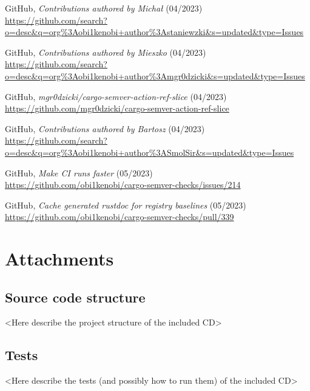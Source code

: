 \documentclass[licencjacka,en]{pracamgr}
\begin{document}
\begin{thebibliography}{99}
 GitHub,
	\textit{Contributions authored by Michał} (04/2023) \\
	\url{https://github.com/search?o=desc&q=org%3Aobi1kenobi+author%3Astaniewzki&s=updated&type=Issues}

 GitHub,
	\textit{Contributions authored by Mieszko} (04/2023) \\
	\url{https://github.com/search?o=desc&q=org%3Aobi1kenobi+author%3Amgr0dzicki&s=updated&type=Issues}

 GitHub,
	\textit{mgr0dzicki/cargo-semver-action-ref-slice} (04/2023) \\
	\url{https://github.com/mgr0dzicki/cargo-semver-action-ref-slice}

 GitHub,
	\textit{Contributions authored by Bartosz} (04/2023) \\
	\url{https://github.com/search?o=desc&q=org%3Aobi1kenobi+author%3ASmolSir&s=updated&type=Issues}




 GitHub,
	\textit{Make CI runs faster} (05/2023) \\
	\url{https://github.com/obi1kenobi/cargo-semver-checks/issues/214}

 GitHub,
	\textit{Cache generated rustdoc for registry baselines} (05/2023) \\
	\url{https://github.com/obi1kenobi/cargo-semver-checks/pull/339}

\end{thebibliography}



\chapter*{Attachments}

\section*{Source code structure}

<Here describe the project structure of the included CD>


\section*{Tests}

<Here describe the tests (and possibly how to run them) of the included CD>
\end{document}
